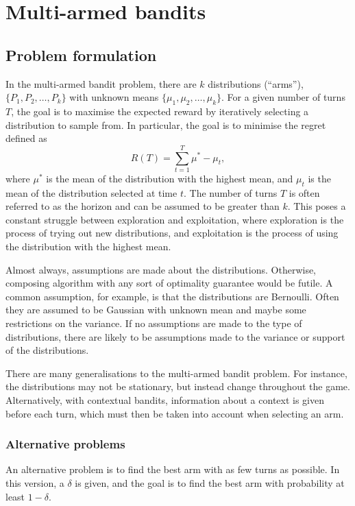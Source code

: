 \chapter{Multi-armed bandits}
\label{chap:bandits}

\section{Problem formulation}
In the multi-armed bandit problem, there are $k$ distributions (\enquote{arms}), $\{P_1, P_2,\dots,P_k\}$ with unknown means $\{\mu_1, \mu_2,\dots,\mu_k\}$.
For a given number of turns $T$, the goal is to maximise the expected reward by iteratively selecting a distribution to sample from.
In particular, the goal is to minimise the regret defined as
\begin{equation}
    R(T) = \sum_{t=1}^T \mu^* - \mu_t,
\end{equation}
where $\mu^*$ is the mean of the distribution with the highest mean, and $\mu_t$ is the mean of the distribution selected at time $t$.
The number of turns $T$ is often referred to as the horizon and can be assumed to be greater than $k$.
This poses a constant struggle between exploration and exploitation, where exploration is the process of trying out new distributions, and exploitation is the process of using the distribution with the highest mean.


Almost always, assumptions are made about the distributions.
Otherwise, composing algorithm with any sort of optimality guarantee would be futile.
A common assumption, for example, is that the distributions are Bernoulli.
Often they are assumed to be Gaussian with unknown mean and maybe some restrictions on the variance.
If no assumptions are made to the type of distributions, there are likely to be assumptions made to the variance or support of the distributions.

There are many generalisations to the multi-armed bandit problem.
For instance, the distributions may not be stationary, but instead change throughout the game.
Alternatively, with contextual bandits, information about a context is given before each turn, which must then be taken into account when selecting an arm.

\subsection{Alternative problems}
An alternative problem is to find the best arm with as few turns as possible.
In this version, a $\delta$ is given, and the goal is to find the best arm with probability at least $1-\delta$.


